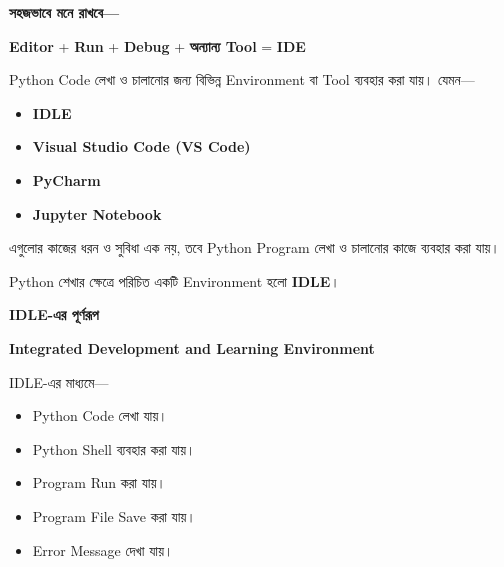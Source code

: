 \textbf{সহজভাবে মনে রাখবে—}

\begin{center}

\textbf{Editor}
+
\textbf{Run}
+
\textbf{Debug}
+
\textbf{অন্যান্য Tool}
=
\textbf{IDE}

\end{center}



Python Code লেখা ও চালানোর জন্য বিভিন্ন Environment বা Tool
ব্যবহার করা যায়। যেমন—

\begin{itemize}

\item \textbf{IDLE}

\item \textbf{Visual Studio Code (VS Code)}

\item \textbf{PyCharm}

\item \textbf{Jupyter Notebook}

\end{itemize}

এগুলোর কাজের ধরন ও সুবিধা এক নয়, তবে Python Program
লেখা ও চালানোর কাজে ব্যবহার করা যায়।



Python শেখার ক্ষেত্রে পরিচিত একটি Environment হলো
\textbf{IDLE}।

\begin{definitionbox}

\textbf{\color{darkTeal}IDLE-এর পূর্ণরূপ}

\textbf{Integrated Development and Learning Environment}

\end{definitionbox}

IDLE-এর মাধ্যমে—

\begin{itemize}

\item Python Code লেখা যায়।

\item Python Shell ব্যবহার করা যায়।

\item Program Run করা যায়।

\item Program File Save করা যায়।

\item Error Message দেখা যায়।

\end{itemize}

